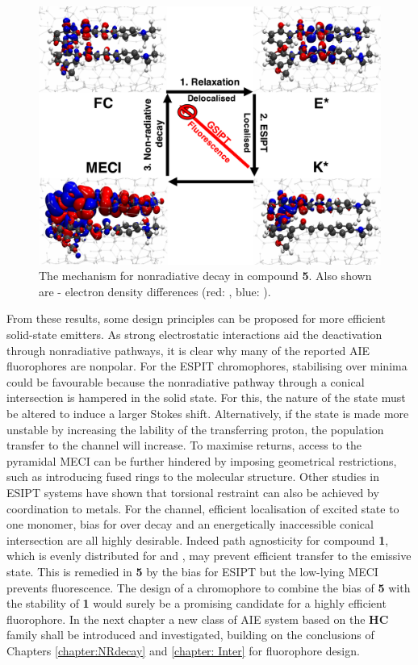 \begin{figure}
  \centering
  \includegraphics[width=0.8\linewidth]{4IntraInterInteractions/HC_5_Density_Mechanism.pdf}
  \caption[Nonradiative decay in \textbf{HC5}]{The mechanism for nonradiative decay in compound \textbf{5}. Also shown are \sone-\szero{} electron density differences (red: \sone{}, blue: \szero{}).}
  \label{figure: HC_5_Density_Mechanism}
\end{figure}

From these results, some design principles can be proposed for more efficient solid-state emitters. As strong electrostatic interactions aid the deactivation through nonradiative pathways, it is clear why many of the reported AIE fluorophores are nonpolar. For the ESPIT chromophores, stabilising \Estar{} over \Kstar{} minima could be favourable because the \Estar{} nonradiative pathway through a conical intersection is hampered in the solid state. For this, the nature of the \Estar{} state must be altered to induce a larger Stokes shift. Alternatively, if the \Estar{} state is made more unstable by increasing the lability of the transferring proton, the population transfer to the \Kstar{} channel will increase. To maximise returns, access to the pyramidal \Kstar{} MECI can be further hindered by imposing geometrical restrictions, such as introducing fused rings to the molecular structure. Other studies in ESIPT systems have shown that torsional restraint can also be achieved by coordination to metals.\cite{Karsili2016} For the \Kstar{} channel, efficient localisation of excited state to one monomer, bias for \Kstar{} over \Estar{} decay and an energetically inaccessible conical intersection are all highly desirable. Indeed path agnosticity for compound \textbf{1}, which is evenly distributed for \Estar{} and \Kstar{}, may prevent efficient transfer to the emissive \Kstar{} state. This is remedied in \textbf{5} by the bias for ESIPT but the low-lying MECI prevents fluorescence. The design of a chromophore to combine the \Kstar{} bias of \textbf{5} with the stability of \textbf{1} would surely be a promising candidate for a highly efficient fluorophore.  In the next chapter a new class of AIE system based on the \textbf{HC} family shall be introduced and investigated, building on the conclusions of Chapters \ref{chapter:NRdecay} and \ref{chapter: Inter} for fluorophore design. 